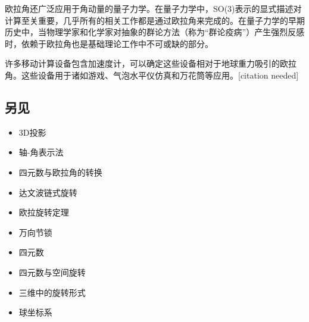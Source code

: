 欧拉角还广泛应用于角动量的量子力学。在量子力学中，SO(3)表示的显式描述对计算至关重要，几乎所有的相关工作都是通过欧拉角来完成的。在量子力学的早期历史中，当物理学家和化学家对抽象的群论方法（称为“群论疫病”）产生强烈反感时，依赖于欧拉角也是基础理论工作中不可或缺的部分。

许多移动计算设备包含加速度计，可以确定这些设备相对于地球重力吸引的欧拉角。这些设备用于诸如游戏、气泡水平仪仿真和万花筒等应用。[citation needed]
\subsection{另见}
\begin{itemize}
\item 3D投影
\item 轴-角表示法
\item 四元数与欧拉角的转换
\item 达文波链式旋转
\item 欧拉旋转定理
\item 万向节锁
\item 四元数
\item 四元数与空间旋转
\item 三维中的旋转形式
\item 球坐标系
\end{itemize}
